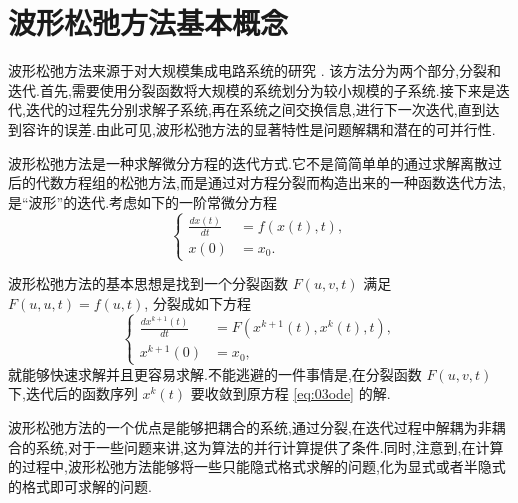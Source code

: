\section{波形松弛方法基本概念}\label{sec:03wrintro}

波形松弛方法来源于对大规模集成电路系统的研究 \cite{lelarasmee1982waveform}. 该方法分为两个部分,分裂和迭代.首先,需要使用分裂函数将大规模的系统划分为较小规模的子系统.接下来是迭代,迭代的过程先分别求解子系统,再在系统之间交换信息,进行下一次迭代,直到达到容许的误差.由此可见,波形松弛方法的显著特性是问题解耦和潜在的可并行性.

波形松弛方法是一种求解微分方程的迭代方式.它不是简简单单的通过求解离散过后的代数方程组的松弛方法,而是通过对方程分裂而构造出来的一种函数迭代方法,是``波形''的迭代.考虑如下的一阶常微分方程
\begin{equation}\label{eq:03ode}
\left\{
\begin{aligned}
\frac{dx(t)}{dt}&=f(x(t),t),\\
x(0)&=x_{0}.
\end{aligned}
\right.
\end{equation}

波形松弛方法的基本思想是找到一个分裂函数 $F(u,v,t)$ 满足 $F(u,u,t)=f(u,t)$, 分裂成如下方程
\begin{equation*}
\left\{
\begin{aligned}
\frac{dx^{k+1}(t)}{dt}&=F(x^{k+1}(t),x^{k}(t),t),\\
x^{k+1}(0)&=x_{0},
\end{aligned}
\right.
\end{equation*}
就能够快速求解并且更容易求解.不能逃避的一件事情是,在分裂函数 $F(u,v,t)$ 下,迭代后的函数序列 $x^{k}(t)$ 要收敛到原方程 \eqref{eq:03ode} 的解.

波形松弛方法的一个优点是能够把耦合的系统,通过分裂,在迭代过程中解耦为非耦合的系统,对于一些问题来讲,这为算法的并行计算提供了条件.同时,注意到,在计算的过程中,波形松弛方法能够将一些只能隐式格式求解的问题,化为显式或者半隐式的格式即可求解的问题.

